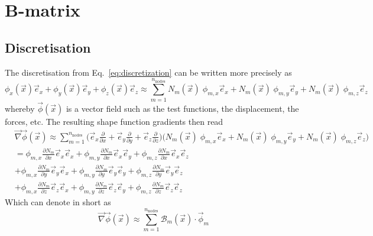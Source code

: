 \documentclass[times,namecite]{goose-article}
\begin{document}
\section{B-matrix}

\subsection{Discretisation}

The discretisation from Eq.~\eqref{eq:discretization} can be written more precisely as
\begin{equation}
  \phi_x(\vec{x}) \vec{e}_x +
  \phi_y(\vec{x}) \vec{e}_y +
  \phi_z(\vec{x}) \vec{e}_z
  \approx
  \sum_{m=1}^{n_\mathrm{nodes}}
  N_m (\vec{x}) \; \phi_{m,x} \vec{e}_x +
  N_m (\vec{x}) \; \phi_{m,y} \vec{e}_y +
  N_m (\vec{x}) \; \phi_{m,z} \vec{e}_z
\end{equation}
whereby $\vec{\phi}(\vec{x})$ is a vector field such as the test functions, the displacement, the forces, etc. The resulting shape function gradients then read
\begin{align}
  &
  \vec{\nabla} \vec{\phi}(\vec{x})
  \approx
  \sum_{m=1}^{n_\mathrm{nodes}}
  \bigg(
    \vec{e}_x \frac{\partial}{\partial x} +
    \vec{e}_y \frac{\partial}{\partial y} +
    \vec{e}_z \frac{\partial}{\partial z}
  \bigg)
  \bigg(
    N_m (\vec{x}) \; \phi_{m,x} \vec{e}_x +
    N_m (\vec{x}) \; \phi_{m,y} \vec{e}_y +
    N_m (\vec{x}) \; \phi_{m,z} \vec{e}_z
  \bigg)
  \\
  &
  =
  \phi_{m,x} \frac{\partial N_m}{\partial x} \vec{e}_x \vec{e}_x + \nonumber
  \phi_{m,y} \frac{\partial N_m}{\partial x} \vec{e}_x \vec{e}_y + \nonumber
  \phi_{m,z} \frac{\partial N_m}{\partial x} \vec{e}_x \vec{e}_z
  \\
  &
  +
  \phi_{m,x} \frac{\partial N_m}{\partial y} \vec{e}_y \vec{e}_x +
  \phi_{m,y} \frac{\partial N_m}{\partial y} \vec{e}_y \vec{e}_y +
  \phi_{m,z} \frac{\partial N_m}{\partial y} \vec{e}_y \vec{e}_z
  \\
  &
  +
  \phi_{m,x} \frac{\partial N_m}{\partial z} \vec{e}_z \vec{e}_x +
  \phi_{m,y} \frac{\partial N_m}{\partial z} \vec{e}_z \vec{e}_y +
  \phi_{m,z} \frac{\partial N_m}{\partial z} \vec{e}_z \vec{e}_z
\end{align}
Which can denote in short as
\begin{equation}
\label{eq:bmatrix:discretisation}
  \vec{\nabla} \vec{\phi} (\vec{x})
  \approx
  \sum_{m=1}^{n_\mathrm{nodes}}
  \mathcal{B}_m (\vec{x}) \cdot \vec{\phi}_m
\end{equation}
\end{document}
